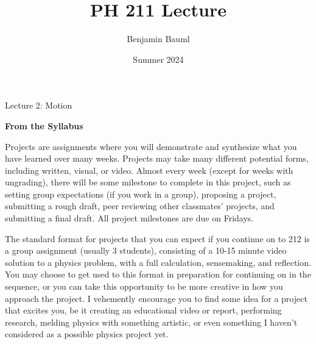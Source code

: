 \documentclass[]{article}
\title{PH 211 Lecture \Week}
\author{Benjamin Bauml}
\date{Summer 2024}
\begin{document}
\begin{TeacherMargin}

\end{TeacherMargin}
\begin{PresentSpace}
\begin{center}
	\huge Lecture 2: Motion
\end{center}
\end{PresentSpace}
\newpage
\begin{TeacherMargin}
\noindent\textbf{From the Syllabus}

Projects are assignments where you will demonstrate and synthesize what you have learned over many weeks. Projects may take many different potential forms, including written, visual, or video. Almost every week (except for weeks with ungrading), there will be some milestone to complete in this project, such as setting group expectations (if you work in a group), proposing a project, submitting a rough draft, peer reviewing other classmates’ projects, and submitting a final draft. All project milestones are due on Fridays.

The standard format for projects that you can expect if you continue on to 212 is a group assignment (usually 3 students), consisting of a 10-15 minute video solution to a physics problem, with a full calculation, sensemaking, and reflection. You may choose to get used to this format in preparation for continuing on in the sequence, or you can take this opportunity to be more creative in how you approach the project. I vehemently encourage you to find some idea for a project that excites you, be it creating an educational video or report, performing research, melding physics with something artistic, or even something I haven’t considered as a possible physics project yet.
\end{TeacherMargin}
\end{document}
